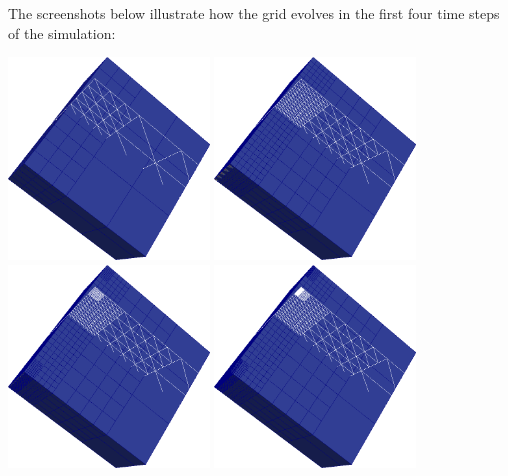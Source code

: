 \noindent
The screenshots below illustrate how the grid evolves in the first four time
steps of the simulation:
\begin{center}
  \includegraphics[width=0.4\textwidth]{41_heat-equation/dynamic00.png}
  \includegraphics[width=0.4\textwidth]{41_heat-equation/dynamic01.png}
  \includegraphics[width=0.4\textwidth]{41_heat-equation/dynamic02.png}
  \includegraphics[width=0.4\textwidth]{41_heat-equation/dynamic03.png}
\end{center}


